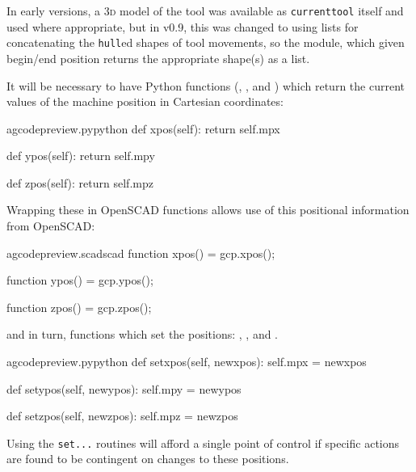 \documentclass{ltxdoc}
\begin{document}
In early versions, a \textsc{3d} model of the tool was available as \verb|currenttool| itself and used where appropriate, but in v0.9, this was changed to using lists for concatenating the \verb|hull|ed shapes of tool movements, so the module,  which given begin/end position returns the appropriate shape(s) as a list.

It will be necessary to have Python functions (, , and ) which return the current values of the machine position in Cartesian coordinates: 

\lstset{firstnumber=\thegcpy}
\begin{writecode}{a}{gcodepreview.py}{python}
    def xpos(self):
        return self.mpx

    def ypos(self):
        return self.mpy

    def zpos(self):
        return self.mpz

\end{writecode}
\addtocounter{gcpy}{16}

Wrapping these in OpenSCAD functions allows use of this positional information from OpenSCAD:

\lstset{firstnumber=\thegcpscad}
\begin{writecode}{a}{gcodepreview.scad}{scad}
function xpos() = gcp.xpos();

function ypos() = gcp.ypos();

function zpos() = gcp.zpos();

\end{writecode}
\addtocounter{gcpscad}{7}

\noindent and in turn, functions which set the positions: 
, 
, and
.%

\lstset{firstnumber=\thegcpy}
\begin{writecode}{a}{gcodepreview.py}{python}
    def setxpos(self, newxpos):
        self.mpx = newxpos

    def setypos(self, newypos):
        self.mpy = newypos

    def setzpos(self, newzpos):
        self.mpz = newzpos
\end{writecode}
\addtocounter{gcpy}{16}

\noindent Using the \verb|set...| routines will afford a single point of control if specific actions are found to be contingent on changes to these positions.
\end{document}
